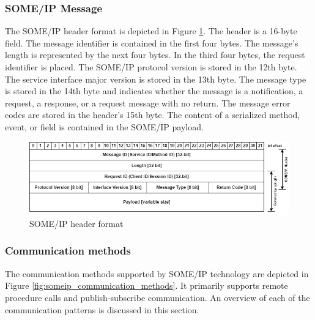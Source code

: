 \subsubsection{SOME/IP Message}
The SOME/IP header format is depicted in Figure \ref{fig:someip_header}. The header is a 16-byte field. The message identifier is contained in the first four bytes. The message's length is represented by the next four bytes. In the third four bytes, the request identifier is placed. The SOME/IP protocol version is stored in the 12th byte. The service interface major version is stored in the 13th byte. The message type is stored in the 14th byte and indicates whether the message is a notification, a request, a response, or a request message with no return. The message error codes are stored in the header's 15th byte. The content of a serialized method, event, or field is contained in the SOME/IP payload.

\begin{figure}[!htb]
	\centering
		\includegraphics[width=\textwidth]{images/someip_header_1.png}
	\caption{SOME/IP header format\cite{b_someip_spec}}
	\label{fig:someip_header}
\end{figure}


\subsubsection{Communication methods}
\label{sec:CommunicationMethods}
The communication methods supported by SOME/IP technology are depicted in Figure \ref{fig:someip_communication_methods}. It primarily supports remote procedure calls and publish-subscribe communication. An overview of each of the communication patterns is discussed in this section.

